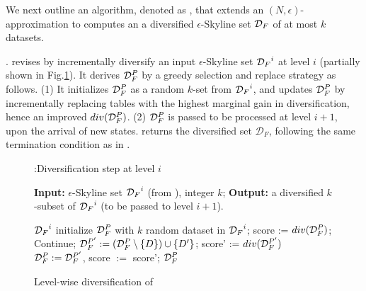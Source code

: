 \vspace{.5ex}
We next outline an algorithm, %
denoted as \divmodis, that extends 
an $(N, \epsilon)$-approximation to 
computes an 
a diversified $\epsilon$-Skyline set ${\mathcal D}_F$  %
of at most $k$ datasets. 



. 
\divmodis revises \modis by incrementally diversify an input $\epsilon$-Skyline set ${{\mathcal D}_F}^{i}$ at level $i$ (partially shown in Fig.\ref{alg:divmodis}). It derives 
${\mathcal D}^P_F$ by a greedy selection and replace strategy 
as follows. 
(1) It initializes ${\mathcal D}^P_F$ as a random $k$-set from ${{\mathcal D}_F}^{i}$, and updates ${\mathcal D}^P_F$ by incrementally replacing tables with the highest marginal gain in diversification, hence an improved $div({\mathcal D}^P_F)$. (2) ${\mathcal D}^P_F$ is passed to be processed at level $i+1$, upon the arrival of new states. \divmodis returns the diversified set $\mathcal{D}_F$, 
following the same termination condition 
as in \apxmodis. 

\begin{figure}
\vspace{-2ex}
\centering
\begin{algorithm}[H]
\caption{:Diversification step at level $i$}
\begin{algorithmic}[1]

\State \textbf{Input:} 
    $\epsilon$-Skyline set ${{\mathcal D}_F}^{i}$ (from \upi),  integer $k$;
\State \textbf{Output:} 
     a diversified $k$-subset of ${{\mathcal D}_F}^{i}$ (to be passed to level $i+1$).
     \vspace{1ex}
    
 \Return ${{\mathcal D}_F}^i$
\EndIf 
\State initialize ${\mathcal D}_F^P$ with $k$ 
random dataset in ${{\mathcal D}_F}^i$; 
\State score := $div({\mathcal D}_F^P)$; 
     Continue;
    \EndIf
    \State ${\mathcal D}_F^{P'} := ({\mathcal D}_F^P \setminus \{D\}) \cup \{D'\}$;
    \State score' := $div({\mathcal D}_F^{P'})$
    \State ${\mathcal D}_F^P := {\mathcal D}_F^{P'}$, score $:=$ score';
    \EndIf
\EndFor
\EndFor
\State \Return ${\mathcal D}_F^P$
\end{algorithmic}
\end{algorithm}
\vspace{-4ex}
\caption{Level-wise diversification of \divmodis}
\vspace{-3ex}
\label{alg:divmodis}
\end{figure}

